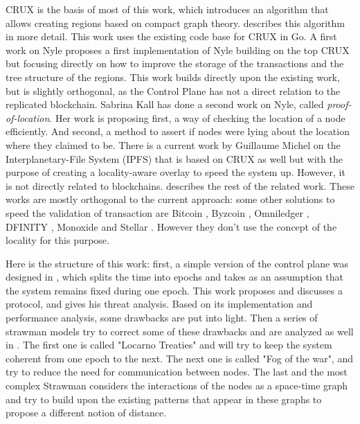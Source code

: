\documentclass[a4paper,11pt,twoside,openright]{report}
\begin{document}
 CRUX \cite{Basescu2014} is the basis of most of this work, which introduces an algorithm that allows creating regions based on compact graph theory.  describes this algorithm in more detail.  This work uses the existing code base for CRUX in Go. A first work on Nyle \cite{Sierro2019} proposes a first
implementation of Nyle building on the top CRUX \cite{Basescu2014} but focusing
directly on how to improve the storage of the transactions and the tree
structure of the regions. This work builds directly upon the existing work, but
is slightly orthogonal, as the Control Plane has not a direct relation to the
replicated blockchain. Sabrina Kall \cite{Kall2019} has done a second work on Nyle, called \textit{proof-of-location}.  Her work is proposing first, a way of checking
the location of a node efficiently. And second, a method to assert if nodes were lying about the
location where they claimed to be. There is a current work by Guillaume
Michel on the Interplanetary-File System (IPFS) \cite{Michel2019} that is
based on CRUX as well but with the purpose of creating a locality-aware overlay
to speed the system up. However, it is not directly related to blockchains.  describes the rest
of the related work. 
These works are mostly orthogonal to the current approach: some other solutions to speed
the validation of transaction are Bitcoin \cite{Nakamoto2009}, Byzcoin
\cite{Kogias2016}, Omniledger \cite{Kokoris-Kogias2017}, DFINITY
\cite{Hanke2018}, Monoxide \cite{Wang2019} and Stellar \cite{Lokhava2019}. However
they don't use the concept of the locality for this purpose. 

Here is the structure of this work: first, a simple version of
the control plane was designed  in , which splits the time
into epochs and takes as an assumption that the system remains fixed during one
epoch. This work proposes and discusses a protocol, and gives his threat analysis.
Based on its implementation and performance analysis, some drawbacks are put
into light. Then a series of strawman models try to correct some of these
drawbacks and are analyzed as well in . The first one
is called "Locarno Treaties" and will try to keep the system coherent from one
epoch to the next. The next one is called "Fog of the war", and try to reduce
the need for communication between nodes. The last and the most complex
Strawman considers the interactions of the nodes as a space-time graph and try
to build upon the existing patterns that appear in these graphs to propose a
different notion of distance. 
\end{document}
